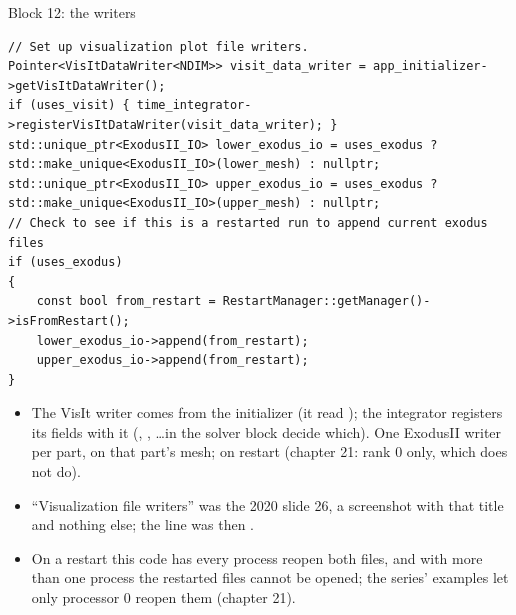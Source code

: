 \documentclass[aspectratio=169,11pt]{beamer}
\begin{document}
\begin{frame}[fragile]{Block 12: the writers}
\label{fr:writers}
\begin{lstlisting}[style=cpptiny]
// Set up visualization plot file writers.
Pointer<VisItDataWriter<NDIM>> visit_data_writer = app_initializer->getVisItDataWriter();
if (uses_visit) { time_integrator->registerVisItDataWriter(visit_data_writer); }
std::unique_ptr<ExodusII_IO> lower_exodus_io = uses_exodus ? std::make_unique<ExodusII_IO>(lower_mesh) : nullptr;
std::unique_ptr<ExodusII_IO> upper_exodus_io = uses_exodus ? std::make_unique<ExodusII_IO>(upper_mesh) : nullptr;
// Check to see if this is a restarted run to append current exodus files
if (uses_exodus)
{
    const bool from_restart = RestartManager::getManager()->isFromRestart();
    lower_exodus_io->append(from_restart);
    upper_exodus_io->append(from_restart);
}
\end{lstlisting}
\footnotesize
\begin{itemize}
  \item The VisIt writer comes from the initializer (it read ); the integrator registers its fields with it (, , \ldots in the solver block decide which). One ExodusII writer per part, on that part's mesh;  on restart (chapter 21: rank $0$ only, which  does not do).
  \item ``Visualization file writers'' was the 2020 slide 26, a screenshot with that title and nothing else; the  line was then .
  \item On a restart this code has every process reopen both files, and with more than one process the restarted files cannot be opened; the series' examples let only processor 0 reopen them (chapter 21).
\end{itemize}
\end{frame}
\end{document}
